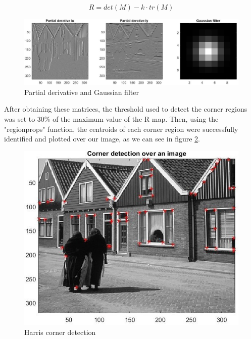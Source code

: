 \begin{equation}
	R = det(M) - k \cdot tr(M)
\end{equation}

\begin{figure}[h]
	\centering
	\includegraphics[width=\linewidth]{"mainmatter/Images/partial derivative and gaussian filter"}
	\caption{Partial derivative and Gaussian filter}
	\label{fig:partial-derivative-and-gaussian-filter}
\end{figure}

After obtaining these matrices, the threshold used to detect the corner regions was set to 30\% of the maximum 
value of the R map. Then, using the "regionprops" function, the centroids of each corner region were successfully 
identified and plotted over our image, as we can see in figure \ref{fig:corner-detection-over-image}. 

\begin{figure}
	\centering
	\includegraphics[width=0.7\linewidth]{"mainmatter/Images/Corner detection over image"}
	\caption{Harris corner detection}
	\label{fig:corner-detection-over-image}
\end{figure}



\newpage
